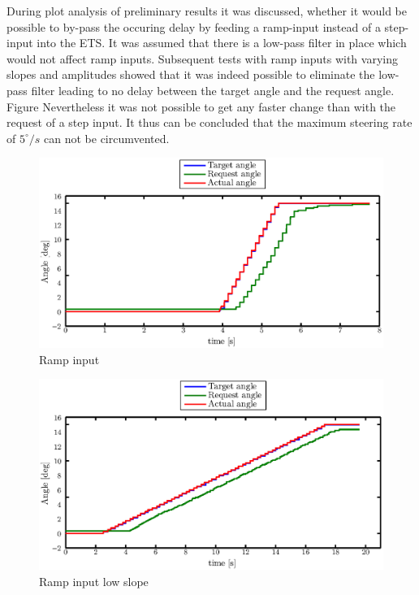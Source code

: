 \documentclass[ExampleMasters.tex]{subfiles}
\begin{document}
During plot analysis of preliminary results it was discussed, whether it would be possible to by-pass the occuring delay by feeding a ramp-input instead of a step-input into the \gls{ETS}. It was assumed that there is a low-pass filter in place which would not affect ramp inputs. Subsequent tests with ramp inputs with varying slopes and amplitudes showed that it was indeed possible to eliminate the low-pass filter leading to no delay between the target angle and the request angle. Figure 
Nevertheless it was not possible to get any faster change than with the request of a step input. It thus can be concluded that the maximum steering rate of $5 ^\circ /s$ can not be circumvented.
\begin{figure}[!hbt]
	\centering
	\includegraphics[width=1\linewidth]{figures/rate_limiter1}
	\caption{Ramp input}
	
	\label{fig:rate_limiter1}
\end{figure}
\begin{figure}[!hbt]
\centering
	\includegraphics[width=1\linewidth]{figures/rate_limiter2}
	\caption{Ramp input low slope}
	
	\label{fig:rate_limiter2}
\end{figure}
\end{document}
